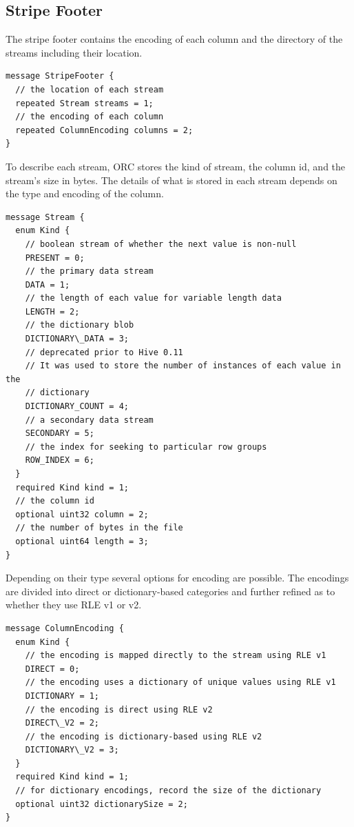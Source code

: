 \documentclass{article}
\begin{document}
\subsection{Stripe Footer}

The stripe footer contains the encoding of each column and the
directory of the streams including their location.

\begin{verbatim}
message StripeFooter {
  // the location of each stream
  repeated Stream streams = 1;
  // the encoding of each column
  repeated ColumnEncoding columns = 2;
}
\end{verbatim}

To describe each stream, ORC stores the kind of stream, the column id,
and the stream's size in bytes. The details of what is stored in each stream
depends on the type and encoding of the column.

\begin{verbatim}
message Stream {
  enum Kind {
    // boolean stream of whether the next value is non-null
    PRESENT = 0;
    // the primary data stream
    DATA = 1;
    // the length of each value for variable length data
    LENGTH = 2;
    // the dictionary blob
    DICTIONARY\_DATA = 3;
    // deprecated prior to Hive 0.11
    // It was used to store the number of instances of each value in the
    // dictionary
    DICTIONARY_COUNT = 4;
    // a secondary data stream
    SECONDARY = 5;
    // the index for seeking to particular row groups
    ROW_INDEX = 6;
  }
  required Kind kind = 1;
  // the column id
  optional uint32 column = 2;
  // the number of bytes in the file
  optional uint64 length = 3;
}
\end{verbatim}

Depending on their type several options for encoding are possible. The
encodings are divided into direct or dictionary-based categories and
further refined as to whether they use RLE v1 or v2.

\begin{verbatim}
message ColumnEncoding {
  enum Kind {
    // the encoding is mapped directly to the stream using RLE v1
    DIRECT = 0;
    // the encoding uses a dictionary of unique values using RLE v1
    DICTIONARY = 1;
    // the encoding is direct using RLE v2
    DIRECT\_V2 = 2;
    // the encoding is dictionary-based using RLE v2
    DICTIONARY\_V2 = 3;
  }
  required Kind kind = 1;
  // for dictionary encodings, record the size of the dictionary
  optional uint32 dictionarySize = 2;
}
\end{verbatim}
\end{document}
